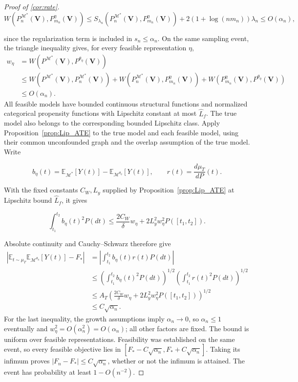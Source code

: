 \begin{proof}[Proof of \cref{cor:rate}]
\[
W(P_n^{\mathcal M^*}(\boldsymbol V),P_{m_n}^\eta(\boldsymbol V))\leqslant S_{\lambda_n}(P_n^{\mathcal M^*}(\boldsymbol V),P_{m_n}^\eta(\boldsymbol V))+2(1+\log(nm_n))\lambda_n\leqslant O(\alpha_n),
\]

since the regularization term is included in $s_n\leqslant\alpha_n$.
    On the same sampling event, the triangle inequality gives, for every feasible representation $\eta$,
\begin{align*}
w_\eta&=W(P^{\mathcal M^*}(\boldsymbol V),P^{\theta_\eta}(\boldsymbol V))\\
&\leqslant W(P^{\mathcal M^*}(\boldsymbol V),P_n^{\mathcal M^*}(\boldsymbol V))+W(P_n^{\mathcal M^*}(\boldsymbol V),P_{m_n}^\eta(\boldsymbol V))+W(P_{m_n}^\eta(\boldsymbol V),P^{\theta_\eta}(\boldsymbol V))\\
&\leqslant O(\alpha_n).
\end{align*}
    All feasible models have bounded continuous structural functions and normalized categorical propensity functions with Lipschitz constant at most $\hat L_f$. The true model also belongs to the corresponding bounded Lipschitz class. Apply Proposition~\ref{prop:Lip_ATE} to the true model and each feasible model, using their common unconfounded graph and the overlap assumption of the true model. Write

\[
b_\eta(t)=\mathbb E_{\mathcal M^*}[Y(t)]-\mathbb E_{\mathcal M^{\theta_\eta}}[Y(t)],\qquad r(t)=\frac{d\mu_T}{dP}(t).
\]

With the fixed constants $C_W,L_y$ supplied by Proposition~\ref{prop:Lip_ATE} at Lipschitz bound $\hat L_f$, it gives

\[
\int_{t_1}^{t_2}b_\eta(t)^2P(dt)\leqslant\frac{2C_W}{\delta}w_\eta+2L_y^2w_\eta^2P([t_1,t_2]).
\]

Absolute continuity and Cauchy--Schwarz therefore give
\begin{align*}
\left|\mathbb E_{t\sim\mu_T}\mathbb E_{\mathcal M^{\theta_\eta}}[Y(t)]-F_*\right|
&=\left|\int_{t_1}^{t_2}b_\eta(t)r(t)P(dt)\right|\\
&\leqslant\left(\int_{t_1}^{t_2}b_\eta(t)^2P(dt)\right)^{1/2}\left(\int_{t_1}^{t_2}r(t)^2P(dt)\right)^{1/2}\\
&\leqslant A_T\left(\frac{2C_W}{\delta}w_\eta+2L_y^2w_\eta^2P([t_1,t_2])\right)^{1/2}\\
&\leqslant C\sqrt{\alpha_n}.
\end{align*}
For the last inequality, the growth assumptions imply $\alpha_n\rightarrow0$, so $\alpha_n\leqslant1$ eventually and $w_\eta^2=O(\alpha_n^2)=O(\alpha_n)$; all other factors are fixed. The bound is uniform over feasible representations. Feasibility was established on the same event, so every feasible objective lies in $[F_*-C\sqrt{\alpha_n},F_*+C\sqrt{\alpha_n}]$. Taking its infimum proves $|F_n-F_*|\leqslant C\sqrt{\alpha_n}$, whether or not the infimum is attained. The event has probability at least $1-O(n^{-2})$.
\end{proof}


